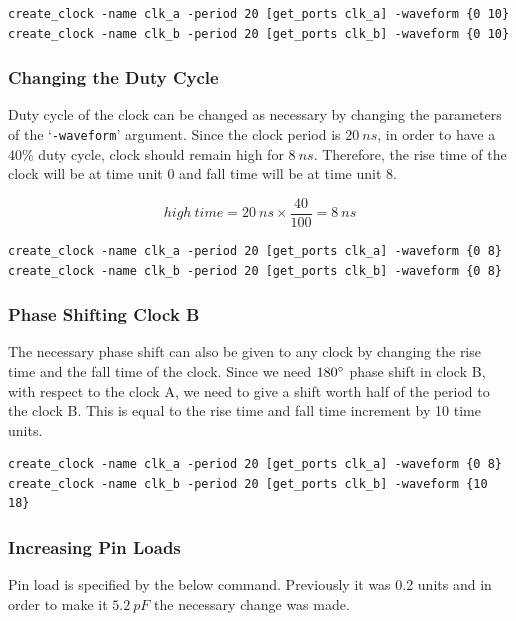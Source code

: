 \documentclass[a4paper,11pt]{article}%
\begin{document}
\begin{Verbatim}[frame=single]
create_clock -name clk_a -period 20 [get_ports clk_a] -waveform {0 10}
create_clock -name clk_b -period 20 [get_ports clk_b] -waveform {0 10}
\end{Verbatim}

\subsubsection{Changing the Duty Cycle}

Duty cycle of the clock can be changed as necessary by changing the parameters of the `{\tt -waveform}' argument. Since the clock period is $20~ns$, in order to have a $40\%$ duty cycle, clock should remain high for $8~ns$. Therefore, the rise time of the clock will be at time unit 0 and fall time will be at time unit 8.

\[
high ~time = 20~ns \times \frac{40}{100} = 8~ns
\]

\begin{Verbatim}[frame=single]
create_clock -name clk_a -period 20 [get_ports clk_a] -waveform {0 8}
create_clock -name clk_b -period 20 [get_ports clk_b] -waveform {0 8}
\end{Verbatim}

\subsubsection{Phase Shifting Clock B}

The necessary phase shift can also be given to any clock by changing the rise time and the fall time of the clock. Since we need $180\degree$ phase shift in clock B, with respect to the clock A, we need to give a shift worth half of the period to the clock B. This is equal to the rise time and fall time increment by 10 time units.

\begin{Verbatim}[frame=single]
create_clock -name clk_a -period 20 [get_ports clk_a] -waveform {0 8}
create_clock -name clk_b -period 20 [get_ports clk_b] -waveform {10 18}
\end{Verbatim}

\subsubsection{Increasing Pin Loads}

Pin load is specified by the below command. Previously it was 0.2 units and in order to make it $5.2~pF$ the necessary change was made.
 
\end{document}
